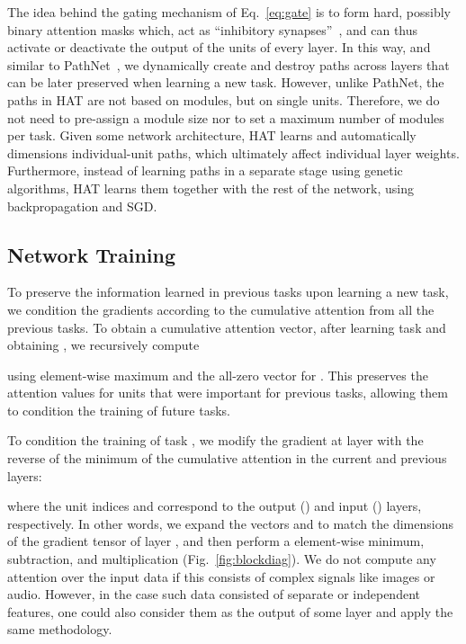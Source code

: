 The idea behind the gating mechanism of Eq.~\ref{eq:gate} is to form hard, possibly binary attention masks which, act as ``inhibitory synapses''~\cite{McCulloch43TBMB}, and can thus activate or deactivate the output of the units of every layer. In this way, and similar to PathNet~\cite{Fernando17ARXIV}, we dynamically create and destroy paths across layers that can be later preserved when learning a new task. However, unlike PathNet, the paths in HAT are not based on modules, but on single units. Therefore, we do not need to pre-assign a module size nor to set a maximum number of modules per task. Given some network architecture, HAT learns and automatically dimensions individual-unit paths, which ultimately affect individual layer weights. Furthermore, instead of learning paths in a separate stage using genetic algorithms, HAT learns them together with the rest of the network, using backpropagation and SGD.

\subsection{Network Training}
\label{sec:Method_NetTrain}

To preserve the information learned in previous tasks upon learning a new task, we condition the gradients according to the cumulative attention from all the previous tasks. To obtain a cumulative attention vector, after learning task  and obtaining , we recursively compute

using element-wise maximum and the all-zero vector for . 
This preserves the attention values for units that were important for previous tasks, allowing them to condition the training of future tasks.

To condition the training of task , we modify the gradient  at layer  with the reverse of the minimum of the cumulative attention in the current and previous layers:

where the unit indices  and  correspond to the output () and input () layers, respectively. In other words, we expand the vectors  and  to match the dimensions of the gradient tensor of layer , and then perform a element-wise minimum, subtraction, and multiplication (Fig.~\ref{fig:blockdiag}). We do not compute any attention over the input data if this consists of complex signals like images or audio. However, in the case such data consisted of separate or independent features, one could also consider them as the output of some layer and apply the same methodology.

